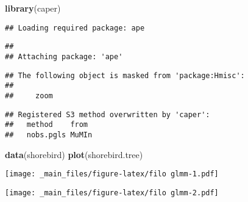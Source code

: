 \documentclass[
]{book}
\newenvironment{Shaded}{\begin{snugshade}}{\end{snugshade}}
\newcommand{\DataTypeTok}[1]{\textcolor[rgb]{0.13,0.29,0.53}{#1}}
\newcommand{\KeywordTok}[1]{\textcolor[rgb]{0.13,0.29,0.53}{\textbf{#1}}}
\newcommand{\NormalTok}[1]{#1}
\newcommand{\OperatorTok}[1]{\textcolor[rgb]{0.81,0.36,0.00}{\textbf{#1}}}
\newcommand{\OtherTok}[1]{\textcolor[rgb]{0.56,0.35,0.01}{#1}}
\newcommand{\StringTok}[1]{\textcolor[rgb]{0.31,0.60,0.02}{#1}}
\begin{document}
\begin{Shaded}
\begin{Highlighting}[]
\KeywordTok{library}\NormalTok{(caper)}
\end{Highlighting}
\end{Shaded}

\begin{verbatim}
## Loading required package: ape
\end{verbatim}

\begin{verbatim}
## 
## Attaching package: 'ape'
\end{verbatim}

\begin{verbatim}
## The following object is masked from 'package:Hmisc':
## 
##     zoom
\end{verbatim}

\begin{verbatim}
## Registered S3 method overwritten by 'caper':
##   method    from 
##   nobs.pgls MuMIn
\end{verbatim}

\begin{Shaded}
\begin{Highlighting}[]
\KeywordTok{data}\NormalTok{(shorebird)}
\KeywordTok{plot}\NormalTok{(shorebird.tree)}
\end{Highlighting}
\end{Shaded}

\texttt{[image: \_main\_files/figure-latex/filo glmm-1.pdf]}

\begin{Shaded}
\end{Shaded}

\texttt{[image: \_main\_files/figure-latex/filo glmm-2.pdf]}

\begin{Shaded}
\end{Shaded}
\end{document}
